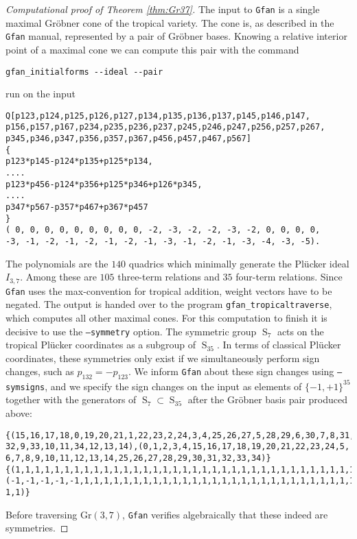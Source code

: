 \documentclass[12pt,a4paper]{amsart}
\theoremstyle{definition}
\newcommand{\Gr}{{\mathrm{Gr}}}
\providecommand\Gfan{\texttt{Gfan}\xspace}
\providecommand{\Sym}{\operatorname{S}}
\begin{document}
\begin{proof}[Computational proof of Theorem \ref{thm:Gr37}]
  The input to \Gfan is a single maximal Gr\"obner cone of the
  tropical variety. The cone is, as described in the \Gfan manual,
  represented by a pair of Gr\"obner bases. Knowing a relative
  interior point of a maximal cone we can compute this pair with the
  command
\begin{verbatim}
gfan_initialforms --ideal --pair
\end{verbatim} 
  run on the input
\begin{verbatim}
Q[p123,p124,p125,p126,p127,p134,p135,p136,p137,p145,p146,p147,
p156,p157,p167,p234,p235,p236,p237,p245,p246,p247,p256,p257,p267,
p345,p346,p347,p356,p357,p367,p456,p457,p467,p567]
{
p123*p145-p124*p135+p125*p134,
....
p123*p456-p124*p356+p125*p346+p126*p345,
....
p347*p567-p357*p467+p367*p457
}
( 0, 0, 0, 0, 0, 0, 0, 0, 0, -2, -3, -2, -2, -3, -2, 0, 0, 0, 0,
-3, -1, -2, -1, -2, -1, -2, -1, -3, -1, -2, -1, -3, -4, -3, -5).
\end{verbatim}
  The polynomials are the $140$ quadrics which minimally generate the
  Pl\"ucker ideal $I_{3,7}$. Among these are $105$ three-term
  relations and $35$ four-term relations.  Since \Gfan uses the
  max-convention for tropical addition, weight vectors have to be
   negated. The output
  is handed over to the program \texttt{gfan\_tropicaltraverse}, which
  computes all other maximal cones. For this computation to finish it
  is decisive to use the \texttt{--symmetry} option. The symmetric
  group $\Sym_7$ acts on the tropical Pl\"ucker coordinates as a
  subgroup of $\Sym_{35}$.  In terms of classical Pl\"ucker
  coordinates, these symmetries only exist if we simultaneously
  perform sign changes, such as $p_{132} = -p_{123}$. We inform \Gfan
  about these sign changes using \texttt{--symsigns}, and we specify the
  sign changes on the input as elements of $\{-1,+1\}^{35}$ together
  with the generators of $\Sym_7\subset \Sym_{35}$ after the Gr\"obner
  basis pair produced above:
\begin{verbatim}
{(15,16,17,18,0,19,20,21,1,22,23,2,24,3,4,25,26,27,5,28,29,6,30,7,8,31,
32,9,33,10,11,34,12,13,14),(0,1,2,3,4,15,16,17,18,19,20,21,22,23,24,5,
6,7,8,9,10,11,12,13,14,25,26,27,28,29,30,31,32,33,34)}
{(1,1,1,1,1,1,1,1,1,1,1,1,1,1,1,1,1,1,1,1,1,1,1,1,1,1,1,1,1,1,1,1,1,1,1),
(-1,-1,-1,-1,-1,1,1,1,1,1,1,1,1,1,1,1,1,1,1,1,1,1,1,1,1,1,1,1,1,1,1,1,1,
1,1)}
\end{verbatim}
  Before traversing $\Gr(3,7)$, \Gfan verifies algebraically that these
  indeed are symmetries.


\end{proof}
\end{document}
